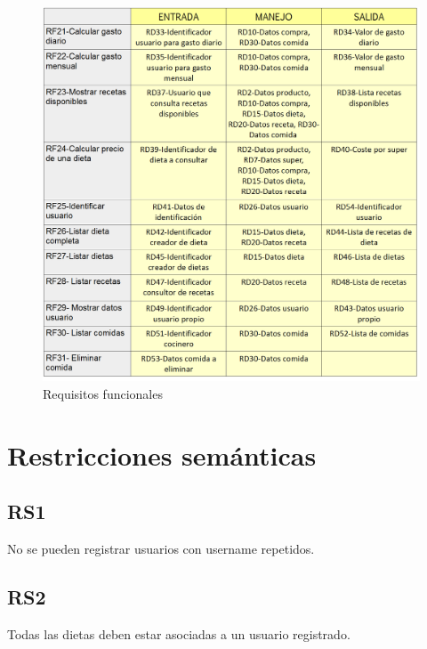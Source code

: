 \documentclass[a4paper,12pt]{report}
\begin{document}
\begin{figure}[!htp]
\centering
\includegraphics[width=0.9\linewidth]{./refinamientos/tablaRF2.png}
\caption{Requisitos funcionales}
\label{fig:Requisitos funcionales}
\medskip
\footnotesize
{}
\end{figure}

\section{Restricciones semánticas}
\label{sec-2-4}
\subsection{RS1}
\label{sec-2-4-1}
No se pueden registrar usuarios con username repetidos.

\subsection{RS2}
\label{sec-2-4-2}
Todas las dietas deben estar asociadas a un usuario registrado.
\end{document}
